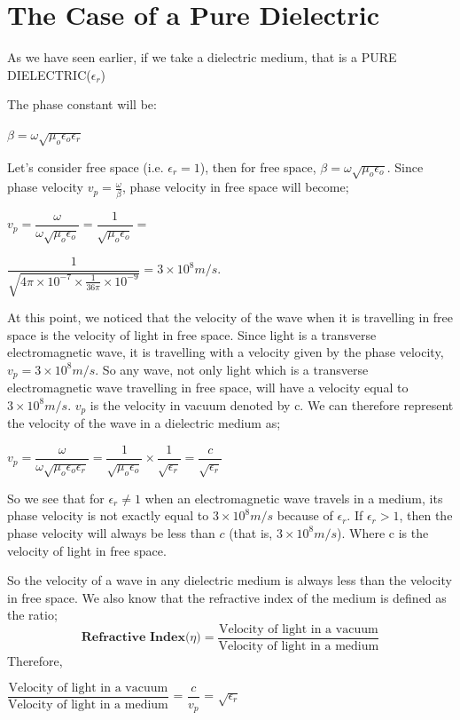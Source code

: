 \section{\textbf{The Case of a Pure Dielectric}}

As we have seen earlier, if we take a dielectric medium, that is a PURE DIELECTRIC($\epsilon_{r}$)

The phase constant will be:

\begin{center}
$\beta=\omega\sqrt{\mu_{o}\epsilon_{o}\epsilon_{r}}$ 
\end{center}

Let's consider free space (i.e. $\epsilon_{r}=1 $), then for free space, $\beta=\omega\sqrt{\mu_{o}\epsilon_{o}}$.
Since phase velocity $v_p=\frac{\omega}{\beta}$, phase velocity in free space will become;

$v_p=\dfrac{\omega}{\omega\sqrt{\mu_{o}\epsilon_{o}}}=\dfrac{1}{\sqrt{\mu_{o}\epsilon_{o}}}=$ 

$\dfrac{1}{\sqrt{4\pi\times 10^{-7}\times \frac{1}{36\pi}\times 10^{-9}}}=3\times 10^{8}m/s.$

At this point, we noticed that the velocity of the wave when it is travelling in free space is the velocity of light in free space. Since light is a transverse electromagnetic wave, it is travelling with a velocity given by the phase velocity, $v_{p} = 3\times 10^{8}m/s$. So any wave, not only light which is a transverse electromagnetic wave travelling in free space, will have a velocity equal to $3\times 10^{8}m/s$. $v_p$ is the velocity in vacuum denoted by c.
We can therefore represent the velocity of the wave in a dielectric medium as;

$v_p=\dfrac{\omega}{\omega\sqrt{\mu_{o}\epsilon_{o}\epsilon_{r}}}=\dfrac{1}{\sqrt{\mu_{o}\epsilon_{o}}}\times \dfrac{1}{\sqrt{\epsilon_{r}}}=\dfrac{c}{\sqrt{\epsilon_{r}}}$

So we see that for $\epsilon_{r}\neq 1$ when an electromagnetic wave travels in a medium, its phase velocity is not exactly equal to  $3\times 10^{8}m/s$ because of $\epsilon_{r}$. If $\epsilon_{r}>1$, then the phase velocity will always be less than $c$ (that is, $3\times 10^{8}m/s$). Where c is the velocity of light in free space.

So the velocity of a wave in any dielectric medium is always less than the velocity in free space. We also know that the refractive index of the medium is defined as the ratio;
\begin{equation}
\textbf{Refractive Index($\eta$)} =	\dfrac{\text{Velocity of light in a vacuum}}{\text{Velocity of light in a medium}}
\end{equation}
Therefore,
\begin{center}
$\dfrac{\text{Velocity of light in a vacuum}}{\text{Velocity of light in a medium}}$	
= $\dfrac{c}{v_{p}}$ = $\sqrt{\epsilon_{r}}$  
\end{center}

